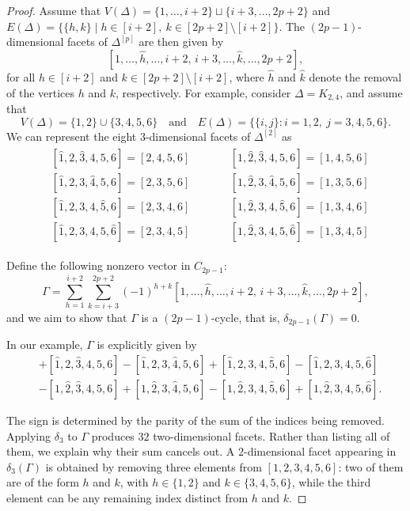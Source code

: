 \documentclass[12pt]{amsart}
\begin{document}
\begin{proof}
Assume that $V(\Delta)=\{1,\dots, i+2\} \sqcup \{i+3,\dots,2p+2\}$ and $
E(\Delta)=\bigl\{\{h,k\} \mid h\in [i+2],\ k\in [2p+2]\setminus[i+2]\bigr\}.$ The $(2p-1)$-dimensional facets of $\Delta^{[p]}$ are then given by
\[
\left[1,\dots,\widehat{h},\dots,i+2,\,i+3,\dots,\widehat{k},\dots,2p+2\right],
\]
for all $h\in [i+2]$ and $k\in [2p+2]\setminus[i+2]$, where $\widehat{h}$ and $\widehat{k}$ denote the removal of the vertices $h$ and $k$, respectively. 
For example, consider $\Delta = K_{2,4}$, and assume that 
\[
V(\Delta)=\{1,2\}\cup \{3,4,5,6\}
\quad \text{and} \quad
E(\Delta)=\bigl\{\{i,j\} : i=1,2,\ j=3,4,5,6\bigr\}.
\]
We can represent the eight $3$-dimensional facets of $\Delta^{[2]}$ as
\begin{align*}
\begin{aligned}
&[\widehat{1},2,\widehat{3},4,5,6]=[2,4,5,6]\\
&[\widehat{1},2,3,\widehat{4},5,6]=[2,3,5,6]\\
&[\widehat{1},2,3,4,\widehat{5},6]=[2,3,4,6]\\
&[\widehat{1},2,3,4,5,\widehat{6}]=[2,3,4,5]
\end{aligned}
\qquad
\begin{aligned}
&[1,\widehat{2},\widehat{3},4,5,6]=[1,4,5,6]\\
&[1,\widehat{2},3,\widehat{4},5,6]=[1,3,5,6]\\
&[1,\widehat{2},3,4,\widehat{5},6]=[1,3,4,6]\\
&[1,\widehat{2},3,4,5,\widehat{6}]=[1,3,4,5]
\end{aligned}
\end{align*}

Define the following nonzero vector in $C_{2p-1}$:
\[
\Gamma = \sum_{h=1}^{i+2} \sum_{k=i+3}^{2p+2} (-1)^{h+k} 
\left[1,\dots,\widehat{h},\dots,i+2,\,i+3,\dots,\widehat{k},\dots,2p+2 \right],
\]
and we aim to show that $\Gamma$ is a $(2p-1)$-cycle, that is, $\delta_{2p-1}(\Gamma)=0$.

In our example, $\Gamma$ is explicitly given by
\begin{align*}
    &+[\widehat{1},2,\widehat{3},4,5,6]
    -[\widehat{1},2,3,\widehat{4},5,6]
    +[\widehat{1},2,3,4,\widehat{5},6]
    -[\widehat{1},2,3,4,5,\widehat{6}] \\
    &-[1,\widehat{2},\widehat{3},4,5,6]
    +[1,\widehat{2},3,\widehat{4},5,6]
    -[1,\widehat{2},3,4,\widehat{5},6]
    +[1,\widehat{2},3,4,5,\widehat{6}].
\end{align*}

\noindent The sign is determined by the parity of the sum of the indices being removed. Applying $\delta_3$ to $\Gamma$ produces $32$ two-dimensional facets. Rather than listing all of them, we explain why their sum cancels out. A $2$-dimensional facet appearing in $\delta_3(\Gamma)$ is obtained by removing three elements from $[1,2,3,4,5,6]$: two of them are of the form $h$ and $k$, with $h \in \{1,2\}$ and $k \in \{3,4,5,6\}$, while the third element can be any remaining index distinct from $h$ and $k$.


\end{proof}
\end{document}
